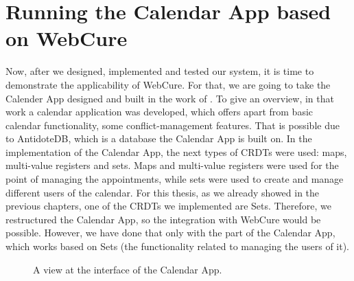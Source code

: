 \section{Running the Calendar App based on WebCure}

Now, after we designed, implemented and tested our system, it is time to demonstrate the applicability of WebCure. For that, we are going to take the Calender App designed and built in the work of \citet{54}. To give an overview, in that work a calendar application was developed, which offers apart from basic calendar functionality, some conflict-management features. That is possible due to AntidoteDB, which is a database the Calendar App is built on. In the implementation of the Calendar App, the next types of CRDTs were used: maps, multi-value registers and sets. Maps and multi-value registers were used for the point of managing the appointments, while sets were used to create and manage different users of the calendar. For this thesis, as we already showed in the previous chapters, one of the CRDTs we implemented are Sets. Therefore, we restructured the Calendar App, so the integration with WebCure would be possible. However, we have done that only with the part of the Calendar App, which works based on Sets (the functionality related to managing the users of it).

\begin{figure}[!htb]
    \begin{center}
    \setlength{\fboxsep}{4pt}%
    \setlength{\fboxrule}{1pt}%
    {\scriptsize%
     }
    \caption {A view at the interface of the Calendar App.}
    \label{fig:ev-fig-1}
\end{center}
\end{figure}

